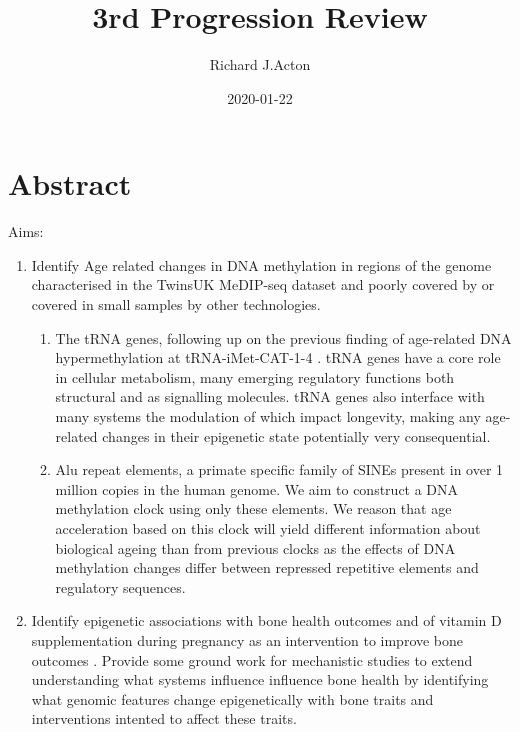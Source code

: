 \documentclass[]{book}
\title{3rd Progression Review}
\subtitle{The Epigenomics of Human Ageing

Academic Unit - Human Development and Health

Supervisors - Chris Bell, Karen Lillycrop and Cyrus Cooper}
\author{Richard J.Acton}
\date{2020-01-22}
\providecommand{\tightlist}{%
  \setlength{\itemsep}{0pt}\setlength{\parskip}{0pt}}
\begin{document}
\maketitle

{
\setcounter{tocdepth}{1}
\tableofcontents
}
\hypertarget{abstract}{%
\chapter*{Abstract}\label{abstract}}

Aims:

\begin{enumerate}
\def\labelenumi{\arabic{enumi}.}
\item
  Identify Age related changes in DNA methylation in regions of the genome characterised in the TwinsUK MeDIP-seq dataset and poorly covered by or covered in small samples by other technologies.

  \begin{enumerate}
  \def\labelenumii{\alph{enumii}.}
  \tightlist
  \item
    The tRNA genes, following up on the previous finding of age-related DNA hypermethylation at tRNA-iMet-CAT-1-4 \citep{Bell2016}. tRNA genes have a core role in cellular metabolism, many emerging regulatory functions both structural and as signalling molecules. tRNA genes also interface with many systems the modulation of which impact longevity, making any age-related changes in their epigenetic state potentially very consequential.
  \item
    Alu repeat elements, a primate specific family of SINEs present in over 1 million copies in the human genome. We aim to construct a DNA methylation clock using only these elements. We reason that age acceleration based on this clock will yield different information about biological ageing than from previous clocks as the effects of DNA methylation changes differ between repressed repetitive elements and regulatory sequences.
  \end{enumerate}
\item
  Identify epigenetic associations with bone health outcomes and of vitamin D supplementation during pregnancy as an intervention to improve bone outcomes \citep{Harvey2012a, Cooper2016}. Provide some ground work for mechanistic studies to extend understanding what systems influence influence bone health by identifying what genomic features change epigenetically with bone traits and interventions intented to affect these traits.
\end{enumerate}
\end{document}
